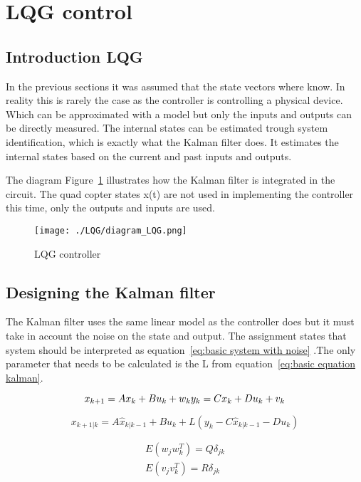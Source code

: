 \section{LQG control}
\subsection{Introduction LQG}
In the previous sections it was assumed that the state vectors where know. In reality this is rarely the case as the controller is controlling a physical device. Which can be approximated with a model but only the inputs and outputs can be directly measured. The internal states can be estimated trough system identification, which is exactly what the Kalman filter does. It estimates the internal states based on the current and past inputs and outputs.

The diagram Figure~\ref{fig:diagram LQG controller} illustrates how the Kalman filter is integrated in the circuit. The quad copter states x(t) are not used in implementing the controller this time, only the outputs and inputs are used. 
\begin{figure}[H]
	\texttt{[image: ./LQG/diagram\_LQG.png]}
	\caption{LQG controller}
	\label{fig:diagram LQG controller}
\end{figure}
\subsection{Designing the Kalman filter}
The Kalman filter uses the same linear model as the controller does but it must take in account the noise on the state and output. The assignment states that system should be interpreted as equation~\ref{eq:basic system with noise} .The only parameter that needs to be calculated is the L from equation~\ref{eq:basic equation kalman}.

\begin{equation}
	x_{k+1} = Ax_k + Bu_k +w_k \\
	y_k = Cx_k + Du_k + v_k
	\label{eq:basic system with noise}
\end{equation}

\begin{equation}
x_{k+1|k} = A\hat{x}_{k|k-1} + Bu_k + L(y_k - C\hat{x}_{k|k-1} - Du_k)
\label{eq:basic equation kalman}
\end{equation}

\begin{eqnarray}
	E(w_jw_k^T) = Q \delta_{jk} \\
	E(v_jv_k^T) = R \delta_{jk}
\end{eqnarray}

